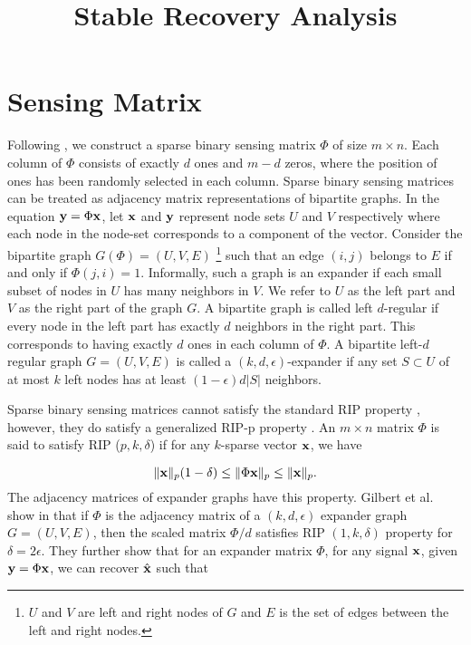 \documentclass[journal, a4paper, onecolumn, draftcls]{IEEEtran} %
\begin{document}
\title{Stable Recovery Analysis}


\maketitle

\section{Sensing Matrix}

Following \cite{mamaghanian2011compressed},
we construct a sparse binary sensing matrix $\Phi$ of size
$m \times n$.
Each column of $\Phi$ consists of exactly $d$ ones and
$m-d$ zeros, where the position of ones has been randomly
selected in each column.
Sparse binary sensing matrices can be treated as adjacency 
matrix representations of bipartite graphs.
In the equation $\mathbf{y} = \Phi \mathbf{x}$, let $\mathbf{x}$
and $\mathbf{y}$ represent node sets $U$ and $V$
respectively where each node in the node-set
corresponds to a component of the vector.
Consider the bipartite graph $G (\Phi) = (U, V, E)$
\footnote{$U$ and $V$ are left and right nodes of $G$
and $E$ is the set of edges between the left and right nodes.}
such that
an edge $(i, j)$ belongs to $E$ if and only if
$\Phi(j, i) = 1$. Informally, such a graph is
an expander \cite{gilbert2010sparse}
if each small subset of nodes in $U$ has many neighbors
in $V$. We refer to $U$ as the left part and $V$
as the right part of the graph $G$.
A bipartite graph is called left $d$-regular
if every node in the left part has exactly
$d$ neighbors in the right part. This corresponds to having
exactly $d$ ones in each column of $\Phi$.
A bipartite left-$d$ regular graph $G = (U, V, E)$
is called a $(k, d, \epsilon)$-expander if any
set $S \subset U$ of at most $k$ left nodes has
at least $(1-\epsilon)d|S|$ neighbors.

Sparse binary sensing matrices cannot satisfy the standard RIP
property \cite{candes2008restricted},
however, they do satisfy a generalized
RIP-p property \cite{gilbert2010sparse}.
An $m \times n$ matrix $\Phi$ is said to satisfy
RIP ($p, k, \delta$) if for any $k$-sparse vector
$\mathbf{x}$, we have

\begin{equation}
\| \mathbf{x} \|_p (1 - \delta) \leq \| \Phi \mathbf{x} \|_p \leq \| \mathbf{x} \|_p.
\end{equation}
The adjacency matrices of expander graphs have
this property. Gilbert et al. show in \cite{gilbert2010sparse}
that if $\Phi$ is the adjacency matrix of a $(k,d, \epsilon)$
expander graph $G = (U, V, E)$, then the scaled matrix
$\Phi / d$ satisfies RIP $(1,k, \delta)$ property for
$\delta = 2 \epsilon$.
They further show that for an expander matrix $\Phi$,
for any signal $\mathbf{x}$, given $\mathbf{y} = \Phi \mathbf{x}$, we
can recover $\hat{\mathbf{x}}$ such that
\end{document}

